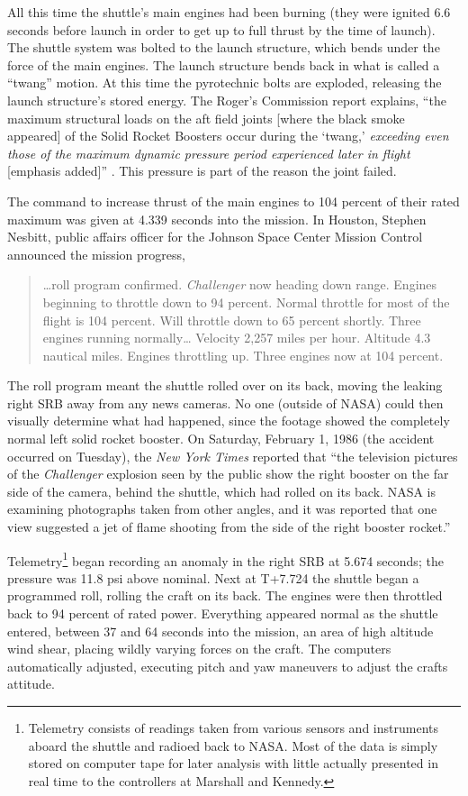 All this time the shuttle's main engines had been burning
(they were ignited 6.6 seconds before launch in order to get
up to full thrust by the time of launch).  The shuttle
system was bolted to the launch structure, which bends under
the force of the main engines.  The launch structure bends
back in what is called a ``twang'' motion.  At this time the
pyrotechnic bolts are exploded, releasing the launch
structure's stored energy.  The Roger's Commission report
explains, ``the maximum structural loads on the aft field
joints [where the black smoke appeared] of the Solid Rocket
Boosters occur during the `twang,' {\em exceeding even
those of the maximum dynamic pressure period experienced
later in flight} [emphasis added]'' \cite[p. 19]{rogers}.
This pressure is part of the reason the joint failed.

The command to increase thrust of the main engines to 104
percent of their rated maximum was given at 4.339 seconds
into the mission.  In Houston, Stephen Nesbitt, public
affairs officer for the Johnson Space Center Mission Control
announced the mission progress,
\begin{singlespace}
\begin{quotation}
\noindent
\ldots roll program confirmed.  {\em Challenger} now heading
down range.  Engines beginning to throttle down to 94
percent.  Normal throttle for most of the flight is 104
percent.  Will throttle down to 65 percent shortly.  Three
engines running normally\ldots
Velocity 2,257 miles per hour.  Altitude 4.3
nautical miles.  Engines throttling up.  Three engines now
at 104 percent.
\end{quotation}
\end{singlespace}
The roll program meant the shuttle rolled over on its back,
moving the leaking right SRB away from any news cameras.  No
one (outside of NASA) could then visually determine what had
happened, since
the footage showed the completely normal left solid rocket
booster.  On Saturday, February 1, 1986 (the accident
occurred on Tuesday), the {\em
New York Times} reported that ``the television pictures of
the {\em Challenger} explosion seen by the public show the
right booster on the far side of the camera, behind the
shuttle, which had rolled on its back.  NASA is examining
photographs taken from other angles, and it was reported
that one view suggested a jet of flame shooting from the
side of the right booster rocket.''

Telemetry\footnote{Telemetry consists of readings taken from
various sensors and instruments aboard the shuttle and
radioed back to NASA.
Most of the data is simply stored on computer tape for later
analysis with little actually presented in real time to the
controllers at Marshall and Kennedy.} began recording an
anomaly in the right SRB at 5.674 seconds; the pressure was
11.8 psi above nominal.
Next at T+7.724 the shuttle began a programmed roll, rolling
the craft on its back.
The engines were then throttled back to 94 percent of rated
power.
Everything appeared normal as the shuttle entered,
between 37 and 64 seconds into the mission, an area of high
altitude wind shear, placing wildly varying forces on the
craft.
The computers automatically adjusted, executing pitch and
yaw maneuvers to adjust the crafts attitude.

